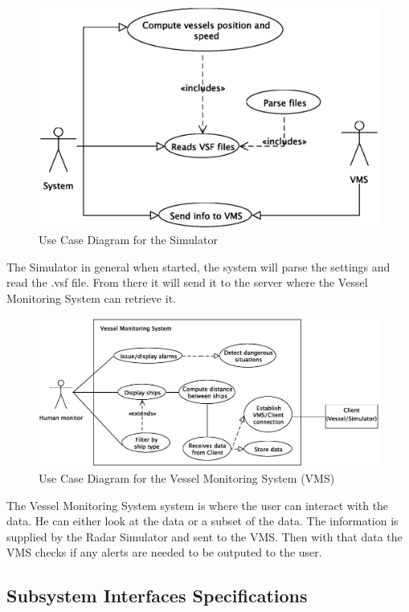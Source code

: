 \documentclass{article}
\begin{document}
\begin{figure}[!htb]
\caption{Use Case Diagram for the Simulator}
\centering
\includegraphics[scale=0.6]{diagrams/simulator-use-case-diagram.eps}
\end{figure}
The Simulator in general when started, the system will parse the settings and read the .vsf file. From there it will send it to the server where the Vessel Monitoring System can retrieve it.

\begin{figure}[!htb]
\caption{Use Case Diagram for the Vessel Monitoring System (VMS)}
\centering
\includegraphics[scale=0.55]{diagrams/vms-use-case-diagram.eps}
\end{figure}
The Vessel Monitoring System system is where the user can interact with the data. He can either look at the data or a subset of the data. 
The information is supplied by the Radar Simulator and sent to the VMS.
Then with that data the VMS checks if any alerts are needed to be outputed to the user.

\break

\subsection{Subsystem Interfaces Specifications} %
\end{document}
